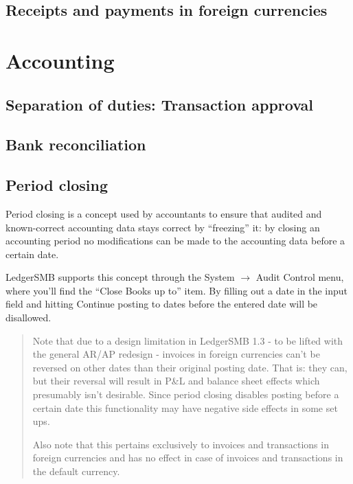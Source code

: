 
\section{Receipts and payments in foreign currencies}

\chapter{Accounting}

\section{Separation of duties: Transaction approval}
\label{sec:SeparationOfDuties}

\section{Bank reconciliation}
\label{sec:Reconciliation}



\section{Period closing}

Period closing is a concept used by accountants to ensure that audited and
known-correct accounting data stays correct by ``freezing'' it: by closing
an accounting period no modifications can be made to the accounting data
before a certain date.

LedgerSMB supports this concept through the System $\rightarrow$ Audit Control
menu, where you'll find the ``Close Books up to'' item. By filling out a date
in the input field and hitting Continue posting to dates before the entered
date will be disallowed.


\begin{quotation}
Note that due to a design limitation in LedgerSMB 1.3 - to be lifted with the
general AR/AP redesign - invoices in foreign currencies can't be reversed on
other dates than their original posting date. That is: they can, but their
reversal will result in P\&L and balance sheet effects which presumably isn't
desirable. Since period closing disables posting before a certain date this
functionality may have negative side effects in some set ups.

Also note that this pertains exclusively to invoices and transactions in foreign
currencies and has no effect in case of invoices and transactions in the default
currency.
\end{quotation}

